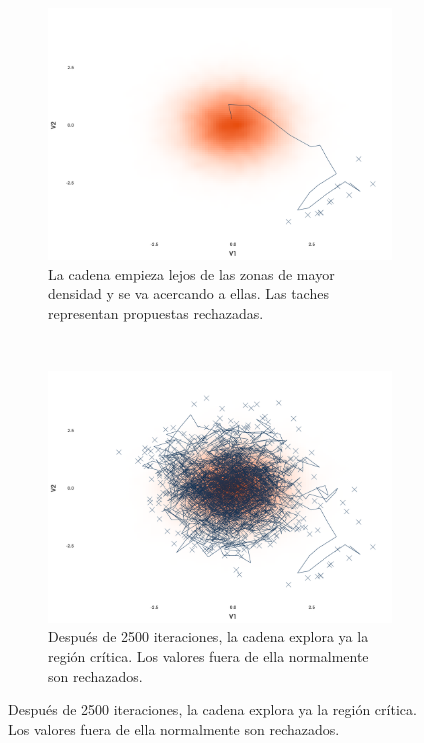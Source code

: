 \begin{figure}[h]
    \centering
    \begin{subfigure}{0.3\textwidth}
        \includegraphics[width=\textwidth]{Figs/Bayes/Ejemplo_RWM}
        \caption{La cadena empieza lejos de las zonas de mayor densidad y se va acercando a ellas. Las taches representan propuestas rechazadas.}
        \label{fig:RWM_A}
    \end{subfigure}
    ~ 
    \begin{subfigure}{0.3\textwidth}
        \includegraphics[width=\textwidth]{Figs/Bayes/Ejemplo2_RWM}
        \caption{Después de 2500 iteraciones, la cadena explora ya la región crítica. Los valores fuera de ella normalmente son rechazados.}
        \label{fig:RWM_B}
    \end{subfigure}

\end{figure}
